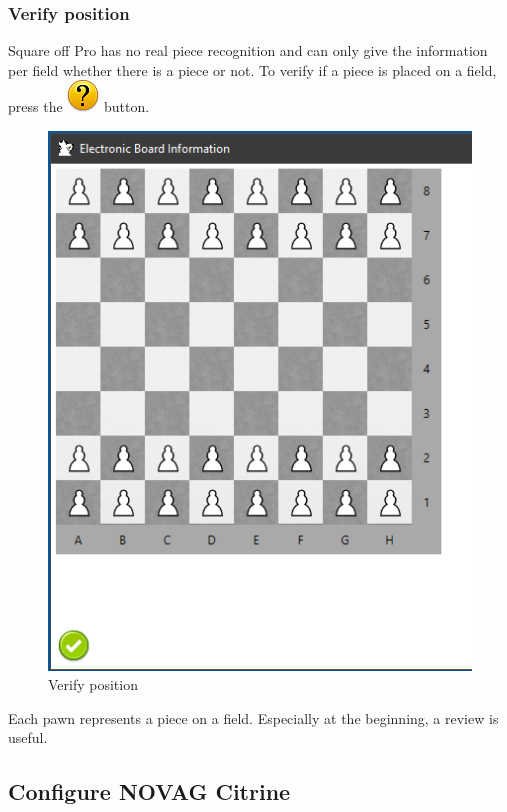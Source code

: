 \documentclass[11pt,a4paper]{article}
\begin{document}
\subsubsection{Verify position} \label{VerifyPegasusPosition}
Square off Pro has no real piece recognition and can only give the information per field whether there is a piece or not. To verify if a piece is placed on a field, press the  \includegraphics[scale=0.4]{emotion_question.png} button.

\begin{figure}[H]
	\centering
	\includegraphics[scale=0.8]{Pegasus5.png}
	\caption{Verify position}
	\label{fig:SquareOffPro5}
\end{figure}

Each pawn represents a piece on a field. Especially at the beginning, a review is useful. 

\subsection{Configure NOVAG Citrine} \label{ConfigureNovagCitrine}
\end{document}
